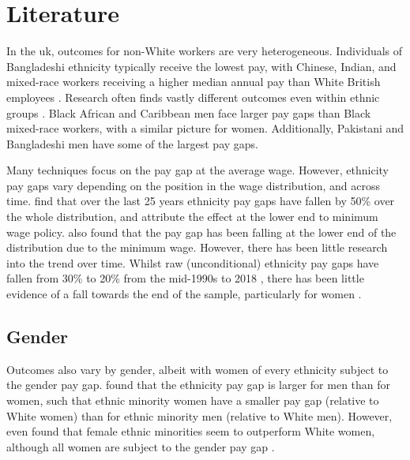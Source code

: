 \documentclass[class=article, crop=false]{standalone}
\begin{document}
\section{Literature}
\label{sec:Literature}
In the \acrshort{uk}, outcomes for non-White workers are very heterogeneous. Individuals of Bangladeshi ethnicity typically receive the lowest pay, with Chinese, Indian, and mixed-race workers receiving a higher median annual pay than White British employees \citep{ONSe}. Research often finds vastly different outcomes even within ethnic groups \citep{Heath}. Black African and Caribbean men face larger pay gaps than Black mixed-race workers, with a similar picture for women. Additionally, Pakistani and Bangladeshi men have some of the largest pay gaps. %

Many techniques focus on the pay gap at the average wage. However, ethnicity pay gaps vary depending on the position in the wage distribution, and across time. \citet{BoE} find that over the last 25 years ethnicity pay gaps have fallen by 50\% over the whole distribution, and attribute the effect at the lower end to minimum wage policy. \citet{Gove} also found that the pay gap has been falling at the lower end of the distribution due to the minimum wage. However, there has been little research into the trend over time. Whilst raw (unconditional) ethnicity pay gaps have fallen from 30\% to 20\% from the mid-1990s to 2018 \cite[p.~11]{BoE}, there has been little evidence of a fall towards the end of the sample, particularly for women \citep{Metcalf, Blackaby}.

\subsection{Gender}
\label{sec:Gender}
Outcomes also vary by gender, albeit with women of every ethnicity subject to the gender pay gap. \citet{Longhi3} found that the ethnicity pay gap is larger for men than for women, such that ethnic minority women have a smaller pay gap (relative to White women) than for ethnic minority men (relative to White men). However, \citet{Metcalf} even found that female ethnic minorities seem to outperform White women, although all women are subject to the gender pay gap \citep{Heath}. %

\end{document}
